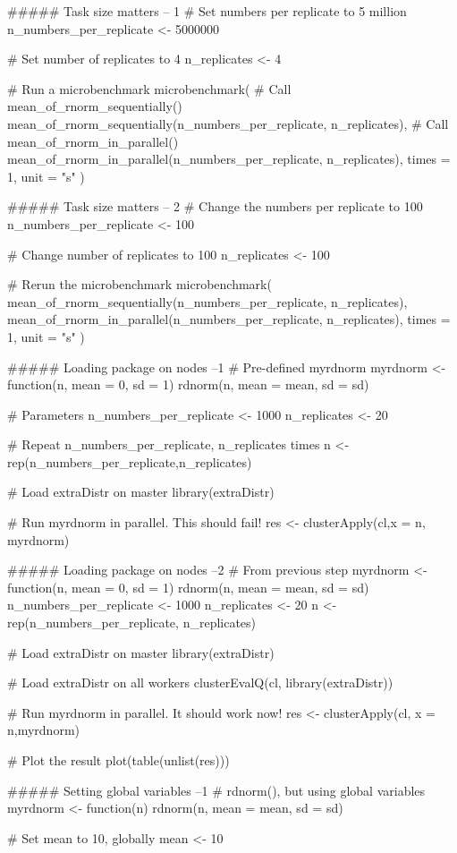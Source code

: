 ##### Task size matters  -- 1
# Set numbers per replicate to 5 million
n_numbers_per_replicate <- 5000000

# Set number of replicates to 4
n_replicates <- 4

# Run a microbenchmark
microbenchmark(
  # Call mean_of_rnorm_sequentially()
  mean_of_rnorm_sequentially(n_numbers_per_replicate, n_replicates), 
  # Call mean_of_rnorm_in_parallel()
  mean_of_rnorm_in_parallel(n_numbers_per_replicate, n_replicates),
  times = 1, 
  unit = "s"
)

##### Task size matters  -- 2
# Change the numbers per replicate to 100
n_numbers_per_replicate <- 100

# Change number of replicates to 100
n_replicates <- 100

# Rerun the microbenchmark
microbenchmark(
  mean_of_rnorm_sequentially(n_numbers_per_replicate, n_replicates), 
  mean_of_rnorm_in_parallel(n_numbers_per_replicate, n_replicates),
  times = 1, 
  unit = "s"
)

##### Loading package on nodes --1
# Pre-defined myrdnorm 
myrdnorm <- function(n, mean = 0, sd = 1) 
    rdnorm(n, mean = mean, sd = sd)

# Parameters
n_numbers_per_replicate <- 1000
n_replicates <- 20

# Repeat n_numbers_per_replicate, n_replicates times
n <- rep(n_numbers_per_replicate,n_replicates)

# Load extraDistr on master
library(extraDistr)

# Run myrdnorm in parallel. This should fail!
res <- clusterApply(cl,x = n, myrdnorm)


##### Loading package on nodes --2
# From previous step
myrdnorm <- function(n, mean = 0, sd = 1) 
    rdnorm(n, mean = mean, sd = sd)
n_numbers_per_replicate <- 1000
n_replicates <- 20
n <- rep(n_numbers_per_replicate, n_replicates)

# Load extraDistr on master
library(extraDistr)

# Load extraDistr on all workers
clusterEvalQ(cl, library(extraDistr))

# Run myrdnorm in parallel. It should work now!
res <- clusterApply(cl, x = n,myrdnorm)

# Plot the result
plot(table(unlist(res)))


##### Setting global variables --1
# rdnorm(), but using global variables
myrdnorm <- function(n) {
  rdnorm(n, mean = mean, sd = sd)
}

# Set mean to 10, globally
mean <- 10

